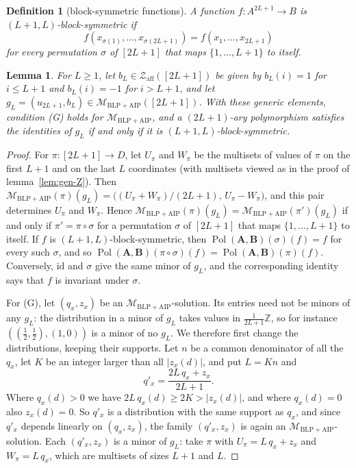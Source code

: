 \documentclass[11pt]{article}
\theoremstyle{plain}
\newtheorem{lemma}[theorem]{Lemma}
\newtheorem{definition}[theorem]{Definition}
\theoremstyle{definition}
\newcommand{\Pol}{\operatorname{Pol}}
\newcommand{\id}{\mathrm{id}}
\newcommand{\bA}{\mathbf{A}}
\newcommand{\bB}{\mathbf{B}}
\newcommand{\Z}{\mathbb{Z}}
\newcommand{\Za}{\mathscr{Z}_{\mathrm{aff}}}
\newcommand{\Mba}{\mathscr{M}_{\mathrm{BLP+AIP}}}
\begin{document}
\begin{definition}[block-symmetric functions]
A function $f\colon A^{2L+1}\to B$ is \emph{$(L+1,L)$-block-symmetric} if
\[
f(x_{\sigma(1)},\dots,x_{\sigma(2L+1)})=f(x_1,\dots,x_{2L+1})
\]
for every permutation $\sigma$ of $[2L+1]$ that maps $\{1,\dots,L+1\}$ to itself.
\end{definition}

\begin{lemma}\label{lem:gen-BA}
For $L\geq1$, let $b_L\in\Za([2L+1])$ be given by $b_L(i)=1$ for $i\leq L+1$ and $b_L(i)=-1$ for $i>L+1$, and let $g_L=(u_{2L+1},b_L)\in\Mba([2L+1])$. With these generic elements, condition (G) holds for $\Mba$, and a $(2L+1)$-ary polymorphism satisfies the identities of $g_L$ if and only if it is $(L+1,L)$-block-symmetric.
\end{lemma}

\begin{proof}
For $\pi\colon[2L+1]\to D$, let $U_\pi$ and $W_\pi$ be the multisets of values of $\pi$ on the first $L+1$ and on the last $L$ coordinates (with multisets viewed as in the proof of lemma~\ref{lem:gen-Z}). Then $\Mba(\pi)(g_L)=\big((U_\pi+W_\pi)/(2L+1),\,U_\pi-W_\pi\big)$, and this pair determines $U_\pi$ and $W_\pi$. Hence $\Mba(\pi)(g_L)=\Mba(\pi')(g_L)$ if and only if $\pi'=\pi\circ\sigma$ for a permutation $\sigma$ of $[2L+1]$ that maps $\{1,\dots,L+1\}$ to itself. If $f$ is $(L+1,L)$-block-symmetric, then $\Pol(\bA,\bB)(\sigma)(f)=f$ for every such $\sigma$, and so $\Pol(\bA,\bB)(\pi\circ\sigma)(f)=\Pol(\bA,\bB)(\pi)(f)$. Conversely, $\id$ and $\sigma$ give the same minor of $g_L$, and the corresponding identity says that $f$ is invariant under $\sigma$.

For (G), let $(q_x,z_x)$ be an $\Mba$-solution. Its entries need not be minors of any $g_L$: the distribution in a minor of $g_L$ takes values in $\frac1{2L+1}\Z$, so for instance $((\tfrac12,\tfrac12),(1,0))$ is a minor of no $g_L$. We therefore first change the distributions, keeping their supports. Let $n$ be a common denominator of all the $q_x$, let $K$ be an integer larger than all $|z_x(d)|$, and put $L=Kn$ and
\[
q'_x=\frac{2L\,q_x+z_x}{2L+1}.
\]
Where $q_x(d)>0$ we have $2L\,q_x(d)\geq2K>|z_x(d)|$, and where $q_x(d)=0$ also $z_x(d)=0$. So $q'_x$ is a distribution with the same support as $q_x$, and since $q'_x$ depends linearly on $(q_x,z_x)$, the family $(q'_x,z_x)$ is again an $\Mba$-solution. Each $(q'_x,z_x)$ is a minor of $g_L$: take $\pi$ with $U_\pi=L\,q_x+z_x$ and $W_\pi=L\,q_x$, which are multisets of sizes $L+1$ and $L$.
\end{proof}
\end{document}

